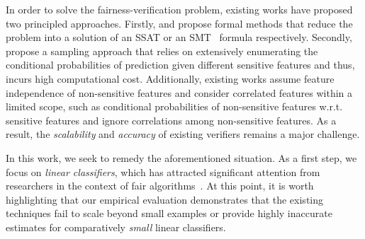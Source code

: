  	
	
	In order to solve the fairness-verification problem, existing works have proposed two principled approaches.	Firstly, \cite{ghosh2020justicia} and \cite{albarghouthi2017fairsquare} propose formal methods that reduce the problem into a solution of an SSAT or an SMT~ formula respectively.	Secondly, \cite{bastani2019probabilistic} propose a sampling approach that relies on extensively enumerating the conditional probabilities of prediction given different sensitive features and thus, incurs high computational cost. Additionally, existing works assume feature independence of non-sensitive features and consider correlated features within a limited scope, such as conditional probabilities of non-sensitive features w.r.t. sensitive features and ignore correlations among non-sensitive features. As a result, the \textit{scalability} and \textit{accuracy} of existing  verifiers remains a major challenge.
	
	 In this work, we seek to remedy the aforementioned situation. As a first step, we focus on  \textit{linear classifiers}, which has attracted significant attention from researchers in the context of fair algorithms~\cite{pleiss2017fairness,zafar2017fairness,dressel2018accuracy, john2020verifying}. At this point, it is worth highlighting that our empirical evaluation demonstrates that the existing techniques fail to scale beyond small examples or provide highly inaccurate estimates for comparatively {\em small} linear classifiers. 
	
	
